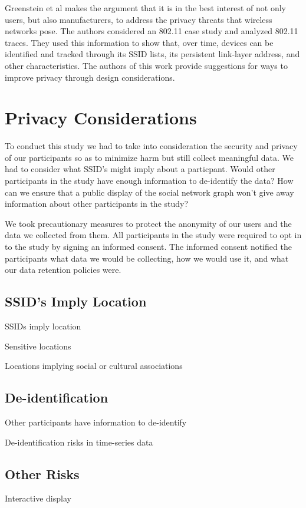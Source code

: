 \documentclass[letterpaper,twocolumn,10pt]{article}
\begin{document}
Greenstein et al makes the argument that it is in the best interest of not only users, but also manufacturers, to address the privacy threats that wireless networks pose. The authors considered an 802.11 case study and analyzed 802.11 traces. They used this information to show that, over time, devices can be identified and tracked through its SSID lists, its persistent link-layer address, and other characteristics. The authors of this work provide suggestions for ways to improve privacy through design considerations.

\section{Privacy Considerations}
To conduct this study we had to take into consideration the security and privacy of our participants so as to minimize harm but still collect meaningful data. We had to consider what SSID's might imply about a particpant. Would other participants in the study have enough information to de-identify the data? How can we ensure that a public display of the social network graph won't give away information about other participants in the study? 

We took precautionary measures to protect the anonymity of our users and the data we collected from them. All participants in the study were required to opt in to the study by signing an informed consent. The informed consent notified the participants what data we would be collecting, how we would use it, and what our data retention policies were. 

\subsection{SSID's Imply Location}
SSIDs imply location

Sensitive locations

Locations implying social or cultural associations



\subsection{De-identification}
Other participants have information to de-identify

De-identification risks in time-series data

\subsection{Other Risks}
Interactive display
\end{document}

